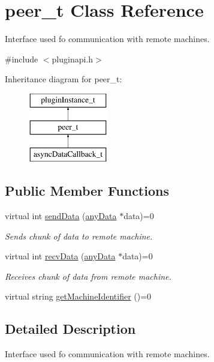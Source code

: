 \hypertarget{classpeer__t}{\section{peer\-\_\-t \-Class \-Reference}
\label{classpeer__t}
}


\-Interface used fo communication with remote machines.  




{\ttfamily \#include $<$pluginapi.\-h$>$}

\-Inheritance diagram for peer\-\_\-t\-:\begin{figure}[H]
\begin{center}
\leavevmode
\includegraphics[height=3.000000cm]{classpeer__t}
\end{center}
\end{figure}
\subsection*{\-Public \-Member \-Functions}
\begin{DoxyCompactItemize}
\item 
virtual int \hyperlink{classpeer__t_a42902fbacfebd9773f4f7ad3527382be}{send\-Data} (\hyperlink{structanyData}{any\-Data} $\ast$data)=0
\begin{DoxyCompactList}\small\item\em \-Sends chunk of data to remote machine. \end{DoxyCompactList}\item 
virtual int \hyperlink{classpeer__t_af0dec938065477f8b131e0d5a7c09513}{recv\-Data} (\hyperlink{structanyData}{any\-Data} $\ast$data)=0
\begin{DoxyCompactList}\small\item\em \-Receives chunk of data from remote machine. \end{DoxyCompactList}\item 
virtual string \hyperlink{classpeer__t_a0eed52b2eedca290ec22e9264155d876}{get\-Machine\-Identifier} ()=0
\end{DoxyCompactItemize}


\subsection{\-Detailed \-Description}
\-Interface used fo communication with remote machines. 

